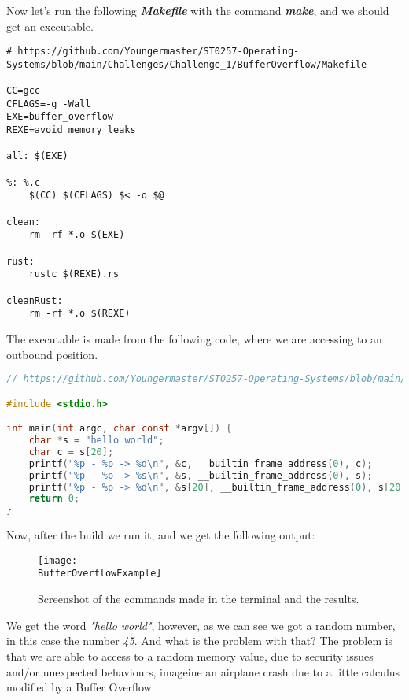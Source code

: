\clearpage

Now let's run the following \textit{\textbf{Makefile}} with the command \textit{\textbf{make}}, and
we should get an executable.

\begin{lstlisting}[language=Make, caption=This file allow us to build or clean the project.]
# https://github.com/Youngermaster/ST0257-Operating-Systems/blob/main/Challenges/Challenge_1/BufferOverflow/Makefile

CC=gcc
CFLAGS=-g -Wall
EXE=buffer_overflow
REXE=avoid_memory_leaks

all: $(EXE)

%: %.c
	$(CC) $(CFLAGS) $< -o $@

clean:
	rm -rf *.o $(EXE)

rust:
	rustc $(REXE).rs

cleanRust:
	rm -rf *.o $(REXE)

\end{lstlisting}

The executable is made from the following code, where we are accessing to an outbound position.

\begin{lstlisting}[language=C, caption=This file shows an implementation of how to do a buffer
    overflow with C.]
// https://github.com/Youngermaster/ST0257-Operating-Systems/blob/main/Challenges/Challenge_1/BufferOverflow/buffer_overflow.c

#include <stdio.h>

int main(int argc, char const *argv[]) {
    char *s = "hello world";
    char c = s[20];
    printf("%p - %p -> %d\n", &c, __builtin_frame_address(0), c);
    printf("%p - %p -> %s\n", &s, __builtin_frame_address(0), s);
    printf("%p - %p -> %d\n", &s[20], __builtin_frame_address(0), s[20]);
    return 0;
}
\end{lstlisting}

Now, after the build we run it, and we get the following output:

\begin{figure}[h]
    \centering
    \texttt{[image: \\BufferOverflowExample]}
    \caption{Screenshot of the commands made in the terminal and the results.}
\end{figure}

We get the word \textit{"hello world"}, however, as we can see we got a random number, in this case
the number \textit{45}. And what is the problem with that? The problem is that we are able to access
to a random memory value, due to security issues and/or unexpected behaviours, imageine an airplane
crash due to a little calculus modified by a Buffer Overflow.


